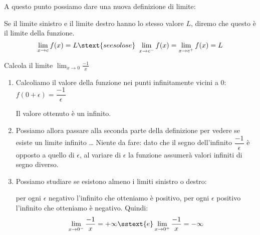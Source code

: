 A questo punto possiamo dare una nuova definizione di limite:
\begin{definizione}
Se il limite sinistro e il limite destro hanno lo stesso valore \(L\), 
diremo che questo è il limite della funzione.
\[\lim_{x \to c}f(x) = L \stext{ se e solo se }~
\lim_{x \to c^-}f(x) = \lim_{x \to c^+}f(x) = L\]
\end{definizione}

\begin{esempio}
Calcola il limite \(\displaystyle \lim_{x \to 0}\frac{-1}{x}\)
\begin{enumerate} %
\item 
Calcoliamo il valore della funzione nei punti infinitamente vicini a \(0\):
~~\(f(0+ \epsilon) = \dfrac{-1}{\epsilon}\)

Il valore ottenuto è un infinito.
\item 
Possiamo allora passare alla seconda parte della definizione per vedere se 
esiste un limite infinito \dots 
Niente da fare: dato che il segno dell'infinito \(\dfrac{-1}{\epsilon}\) 
è opposto a quello di \(\epsilon\), al variare di \(\epsilon\) la 
funzione assumerà valori infiniti di segno diverso.
\item 
Possiamo studiare se esistono almeno i limiti sinistro o destro:

per ogni \(\epsilon\) negativo l'infinito che 
otteniamo è positivo, per ogni \(\epsilon\) positivo l'infinito che 
otteniamo è negativo. Quindi:
\[\lim_{x \to 0^-}\frac{-1}{x} = +\infty \sstext{e} 
\lim_{x \to 0^+}\frac{-1}{x} = -\infty\]
\end{enumerate}
\end{esempio}


